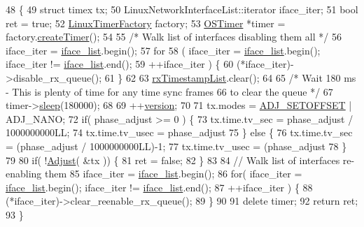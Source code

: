\begin{DoxyCode}
48                                                                                 \{
49     \textcolor{keyword}{struct }timex tx;
50     LinuxNetworkInterfaceList::iterator iface\_iter;
51     \textcolor{keywordtype}{bool} ret = \textcolor{keyword}{true};
52     \hyperlink{class_linux_timer_factory}{LinuxTimerFactory} factory;
53     \hyperlink{class_o_s_timer}{OSTimer} *timer = factory.\hyperlink{class_linux_timer_factory_aa860b8a3f499753959b9148bf48cda4d}{createTimer}();
54         
55     \textcolor{comment}{/* Walk list of interfaces disabling them all */}
56     iface\_iter = \hyperlink{class_linux_timestamper_generic_a71c6eb5a2c243c3e622503aa7c0eff67}{iface\_list}.begin();
57     \textcolor{keywordflow}{for}
58         ( iface\_iter = \hyperlink{class_linux_timestamper_generic_a71c6eb5a2c243c3e622503aa7c0eff67}{iface\_list}.begin(); iface\_iter != \hyperlink{class_linux_timestamper_generic_a71c6eb5a2c243c3e622503aa7c0eff67}{iface\_list}.end();
59           ++iface\_iter ) \{
60         (*iface\_iter)->disable\_rx\_queue();
61     \}
62         
63     \hyperlink{class_linux_timestamper_generic_a3ab5f699ce3a90c21782087bdae99de9}{rxTimestampList}.clear();
64         
65     \textcolor{comment}{/* Wait 180 ms - This is plenty of time for any time sync frames}
66 \textcolor{comment}{       to clear the queue */}
67     timer->\hyperlink{class_o_s_timer_a1f92d99fa856da853c92acd11302b9cb}{sleep}(180000);
68         
69     ++\hyperlink{class_common_timestamper_ab22abc2906422da61885ac6c8e6a1a59}{version};
70         
71     tx.modes = \hyperlink{linux__hal__generic__adj_8cpp_a536e4ee365f962750ea39d0479d61bba}{ADJ\_SETOFFSET} | ADJ\_NANO;
72     \textcolor{keywordflow}{if}( phase\_adjust >= 0 ) \{
73         tx.time.tv\_sec  = phase\_adjust / 1000000000LL;
74         tx.time.tv\_usec = phase\_adjust %
75     \} \textcolor{keywordflow}{else} \{
76         tx.time.tv\_sec  = (phase\_adjust / 1000000000LL)-1;
77         tx.time.tv\_usec = (phase\_adjust %
78     \}
79 
80     \textcolor{keywordflow}{if}( !\hyperlink{class_linux_timestamper_generic_a1d52a5a84b74222b880522cee01475e1}{Adjust}( &tx )) \{
81         ret = \textcolor{keyword}{false};
82     \}
83         
84     \textcolor{comment}{// Walk list of interfaces re-enabling them}
85     iface\_iter = \hyperlink{class_linux_timestamper_generic_a71c6eb5a2c243c3e622503aa7c0eff67}{iface\_list}.begin();
86     \textcolor{keywordflow}{for}( iface\_iter = \hyperlink{class_linux_timestamper_generic_a71c6eb5a2c243c3e622503aa7c0eff67}{iface\_list}.begin(); iface\_iter != \hyperlink{class_linux_timestamper_generic_a71c6eb5a2c243c3e622503aa7c0eff67}{iface\_list}.end();
87          ++iface\_iter ) \{
88         (*iface\_iter)->clear\_reenable\_rx\_queue();
89     \}
90       
91     \textcolor{keyword}{delete} timer;
92     \textcolor{keywordflow}{return} ret;
93 \}
\end{DoxyCode}


